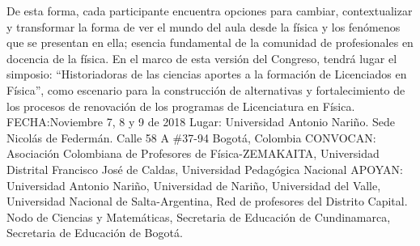 De esta forma, cada participante encuentra opciones para cambiar, contextualizar y transformar la forma de ver el mundo del aula desde la física y los fenómenos que se presentan en ella; esencia fundamental de la comunidad de profesionales en docencia de la física.
En el marco de esta versión del Congreso, tendrá lugar el simposio: “Historiadoras de las ciencias aportes a la formación de Licenciados en Física”, como escenario para la construcción de alternativas y fortalecimiento de los procesos de renovación de los programas de Licenciatura en Física.
FECHA:Noviembre 7, 8 y 9 de 2018
Lugar: Universidad Antonio Nariño. Sede Nicolás de Federmán. Calle 58 A \#37-94 Bogotá, Colombia
CONVOCAN: Asociación Colombiana de Profesores de Física-ZEMAKAITA, Universidad Distrital Francisco José de Caldas, Universidad Pedagógica Nacional
APOYAN: Universidad Antonio Nariño, Universidad de Nariño, Universidad del Valle, Universidad Nacional de Salta-Argentina, Red de profesores del Distrito Capital. Nodo de Ciencias y Matemáticas, Secretaria de Educación de Cundinamarca, Secretaria de Educación de Bogotá.
